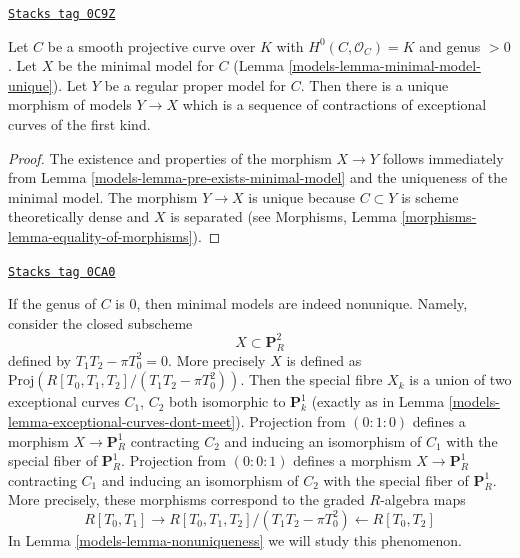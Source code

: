 \begin{lemma}
\label{models-lemma-minimal-model-mapping-property}
\href{https://stacks.math.columbia.edu/tag/0C9Z}{\texttt{Stacks tag 0C9Z}}

Let $C$ be a smooth projective curve over $K$ with $H^0(C, \mathcal{O}_C) = K$
and genus $> 0$. Let $X$ be the minimal model for $C$
(Lemma \ref{models-lemma-minimal-model-unique}).
Let $Y$ be a regular proper model for $C$. Then there is a unique
morphism of models $Y \to X$ which is a sequence of contractions of
exceptional curves of the first kind.
\end{lemma}

\begin{proof}

The existence and properties of the morphism $X \to Y$
follows immediately from Lemma \ref{models-lemma-pre-exists-minimal-model}
and the uniqueness of the minimal model.
The morphism $Y \to X$ is unique because
$C \subset Y$ is scheme theoretically dense and $X$ is separated
(see Morphisms, Lemma \ref{morphisms-lemma-equality-of-morphisms}).
\end{proof}

\begin{example}
\label{models-example-nonunique-in-genus-zero}
\href{https://stacks.math.columbia.edu/tag/0CA0}{\texttt{Stacks tag 0CA0}}

If the genus of $C$ is $0$, then minimal models are indeed nonunique.
Namely, consider the closed subscheme
$$
X \subset \mathbf{P}^2_R
$$
defined by $T_1T_2 - \pi T_0^2 = 0$. More precisely $X$ is defined
as $\text{Proj}(R[T_0, T_1, T_2]/(T_1T_2 - \pi T_0^2))$. Then the
special fibre $X_k$ is a union of two exceptional curves $C_1$, $C_2$ both
isomorphic to $\mathbf{P}^1_k$
(exactly as in Lemma \ref{models-lemma-exceptional-curves-dont-meet}).
Projection from $(0 : 1 : 0)$ defines a morphism $X \to \mathbf{P}^1_R$
contracting $C_2$ and inducing an isomorphism of $C_1$ with the special
fiber of $\mathbf{P}^1_R$. Projection from $(0 : 0 : 1)$ defines a
morphism $X \to \mathbf{P}^1_R$ contracting $C_1$ and inducing an
isomorphism of $C_2$ with the special fiber of $\mathbf{P}^1_R$.
More precisely, these morphisms correspond to the graded $R$-algebra
maps
$$
R[T_0, T_1] \longrightarrow
R[T_0, T_1, T_2]/(T_1T_2 - \pi T_0^2) \longleftarrow
R[T_0, T_2]
$$
In Lemma \ref{models-lemma-nonuniqueness} we will study this phenomenon.
\end{example}

